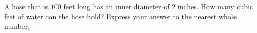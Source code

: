 A hose that is $100$ feet long has an inner diameter of $2$ inches. How many cubic feet of water can the hose hold? Express your answer to the nearest whole number.
